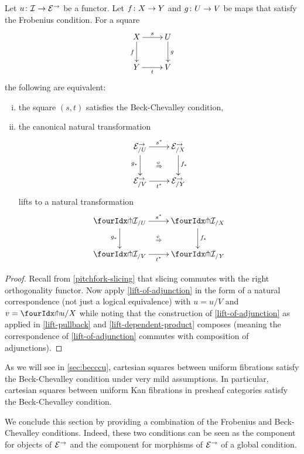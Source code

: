 \documentclass[reqno,10pt,a4paper,oneside,draft]{amsart}
\begin{document}
\begin{proposition} \label{lift-pushforward-BC}
Let $u \co \cal{I} \to \catE^\to$ be a functor.
Let $f \co X \to Y$ and $g \co U \to V$ be maps that satisfy the Frobenius condition.
For a square
\[
\xymatrix{
  X
  \ar[d]_{f}
  \ar[r]^{s}
&
  U
  \ar[d]^{g}
\\
  Y
  \ar[r]_{t}
&
  V
}
\]
the following are equivalent:
\begin{enumerate}[(i)]
\item the square $(s,t)$ satisfies the Beck-Chevalley condition,
\item the canonical natural transformation
\[
\xymatrix{
  \catE^\to_{/U}
  \ar[d]_{g_*}
  \ar[r]^{s^*}
  \ar@{}[dr]|{\stackrel{\psi\;}{\Rightarrow}}
&
  \catE^\to_{/X} \ar[d]^{f_*} 
\\
  \catE^\to_{/V}  \ar[r]_{t^*}
&
  \catE^\to_{/Y}
}
\]
lifts to a natural transformation  
\[
\xymatrix{
  \liftr{\cal{I}}_{/U}
  \ar[d]_{g_*}
  \ar[r]^{s^*}
  \ar@{}[dr]|{\stackrel{\psi\;}{\Rightarrow}}
&
  \liftr{\cal{I}}_{/X} \ar[d]^{f_*} 
\\
  \liftr{\cal{I}}_{/V}  \ar[r]_{t^*}
&
  \liftr{\cal{I}}_{/Y}
}
\]

\end{enumerate}
\end{proposition}

\begin{proof}
Recall from \cref{pitchfork-slicing} that slicing commutes with the right orthogonality functor.
Now apply \cref{lift-of-adjunction} in the form of a natural correspondence (not just a logical equivalence) with $u = u/V$ and $v = \liftr{u}/X$ while noting that the construction of \cref{lift-of-adjunction} as applied in \cref{lift-pullback} and \cref{lift-dependent-product} composes (meaning the correspondence of \cref{lift-of-adjunction} commutes with composition of adjunctions).
\end{proof}

As we will see in \cref{sec:becccu}, cartesian squares between uniform fibrations satisfy the Beck-Chevalley condition under very mild assumptions.
In particular, cartesian squares between uniform Kan fibrations in presheaf categories satisfy the Beck-Chevalley condition.

\medskip

We conclude this section by providing a combination of the Frobenius and Beck-Chevalley conditions. Indeed, these two
conditions can be seen as the component for objects of $\cal{E}^\to$ and the component for morphisms of $\cal{E}^\to$
of a global condition. 
\end{document}
